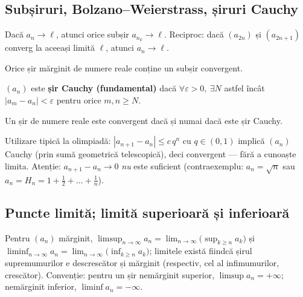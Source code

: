 \subsection{Subșiruri, Bolzano--Weierstrass, șiruri Cauchy}

\begin{teorema}
Dacă $a_n\to\ell$, atunci orice subșir $a_{n_k}\to\ell$. Reciproc: dacă $(a_{2n})$ și $(a_{2n+1})$ converg la aceeași limită $\ell$, atunci $a_n\to\ell$.
\end{teorema}

\begin{lema}
Orice șir mărginit de numere reale conține un subșir convergent.
\end{lema}

\begin{definitie}
$(a_n)$ este \textbf{șir Cauchy (fundamental)} dacă $\forall\varepsilon>0,\ \exists N$ astfel încât $|a_m-a_n|<\varepsilon$ pentru orice $m,n\ge N$.
\end{definitie}

\begin{teorema}
Un șir de numere reale este convergent dacă și numai dacă este șir Cauchy.
\end{teorema}

\begin{obs}
Utilizare tipică la olimpiadă: $|a_{n+1}-a_n|\le c\, q^n$ cu $q\in(0,1)$ implică $(a_n)$ Cauchy (prin sumă geometrică telescopică), deci convergent --- fără a cunoaște limita. Atenție: $a_{n+1}-a_n\to 0$ \emph{nu} este suficient (contraexemplu: $a_n=\sqrt{n}$ sau $a_n=H_n=1+\tfrac12+\dots+\tfrac1n$).
\end{obs}

\subsection{Puncte limită; limită superioară și inferioară}

\begin{definitie}
Pentru $(a_n)$ mărginit, $\displaystyle\limsup_{n\to\infty} a_n=\lim_{n\to\infty}\Big(\sup_{k\ge n} a_k\Big)$ și $\displaystyle\liminf_{n\to\infty} a_n=\lim_{n\to\infty}\Big(\inf_{k\ge n} a_k\Big)$; limitele există fiindcă șirul supremumurilor e descrescător și mărginit (respectiv, cel al infimumurilor, crescător). Convenție: pentru un șir nemărginit superior, $\limsup a_n=+\infty$; nemărginit inferior, $\liminf a_n=-\infty$.
\end{definitie}

